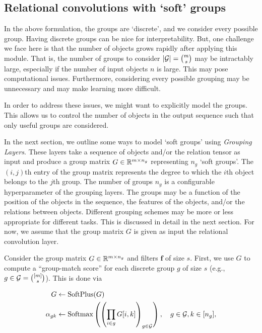 \subsection{Relational convolutions with `soft' groups}

In the above formulation, the groups are `discrete', and we consider every possible group. Having discrete groups can be nice for interpretability. But, one challenge we face here is that the number of objects grows rapidly after applying this module. That is, the number of groups to consider $\left\lvert{\mathcal{G}}\right\rvert = \binom{m}{s}$ may be intractably large, especially if the number of input objects $n$ is large. This may pose computational issues. Furthermore, considering every possible grouping may be unnecessary and may make learning more difficult.

In order to address these issues, we might want to explicitly model the groups. This allows us to control the number of objects in the output sequence such that only useful groups are considered.

In the next section, we outline some ways to model `soft groups' using \textit{Grouping Layers}. These layers take a sequence of objects and/or the relation tensor as input and produce a group matrix $G \in \mathbb{R}^{m \times n_g}$ representing $n_g$ `soft groups'. The $(i,j)$th entry of the group matrix represents the degree to which the $i$th object belongs to the $j$th group. The number of groups $n_g$ is a configurable hyperparameter of the grouping layers. The groups may be a function of the position of the objects in the sequence, the features of the objects, and/or the relations between objects. Different grouping schemes may be more or less appropriate for different tasks. This is discussed in detail in the next section. For now, we assume that the group matrix $G$ is given as input the relational convolution layer.

Consider the group matrix $G \in \mathbb{R}^{m \times n_g}$ and filters $\bm{f}$ of size $s$. First, we use $G$ to compute a ``group-match score'' for each discrete group $g$ of size $s$ (e.g., $g \in {\mathcal{G}} = \binom{[m]}{s}$). This is done via

\begin{equation}
    \label{eq:group_match_score}
    \begin{split}
        G &\gets \text{SoftPlus}(G)\\
        \alpha_{gk} &\gets \text{Softmax}\left(\left(\prod_{i \in g} G[i,k]\right)_{g \in {\mathcal{G}}}\right), \quad g \in {\mathcal{G}}, k \in [n_g],
    \end{split}
\end{equation}

